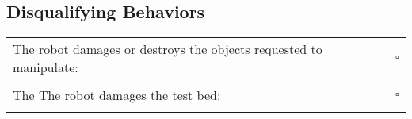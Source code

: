 \subsection*{Disqualifying Behaviors}
\begin{tabular}{ l c}
The robot damages or destroys the objects requested to manipulate: & $\square$ \\ \\
The The robot damages the test bed: & $\square$ \\ \\
\end{tabular}


